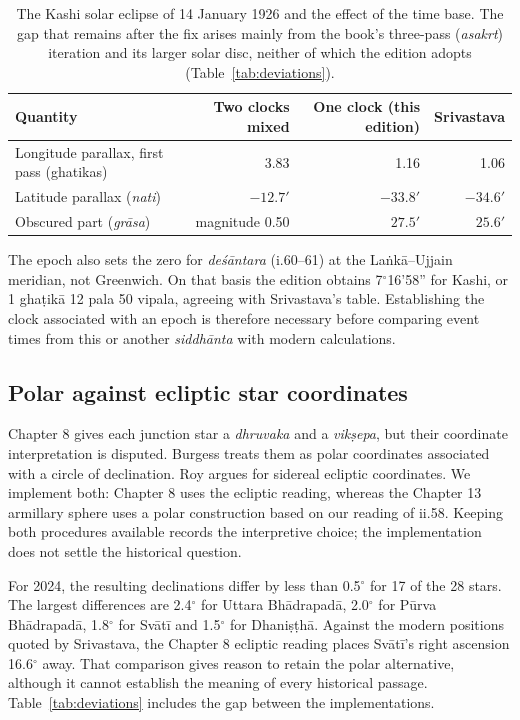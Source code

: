 \documentclass[11pt,a4paper]{article}
\begin{document}
\begin{table}[ht]
\centering
\caption{The Kashi solar eclipse of 14 January 1926 and the effect of the time base. The gap that remains after the fix arises mainly from the book's three-pass (\textit{asakrt}) iteration and its larger solar disc, neither of which the edition adopts (Table~\ref{tab:deviations}).}
\label{tab:kashi}
\small
\begin{tabular}{@{}lrrr@{}}
\toprule
Quantity & Two clocks mixed & One clock (this edition) & Srivastava \\
\midrule
Longitude parallax, first pass (ghatikas) & 3.83 & 1.16 & 1.06 \\
Latitude parallax (\textit{nati}) & $-12.7'$ & $-33.8'$ & $-34.6'$ \\
Obscured part (\textit{gr\=asa}) & magnitude 0.50 & $27.5'$ & $25.6'$ \\
\bottomrule
\end{tabular}
\end{table}

The epoch also sets the zero for \textit{de\'{s}\={a}ntara} (i.60--61) at the La\.{n}k\={a}--Ujjain meridian, not Greenwich. On that basis the edition obtains 7$^\circ$16'58'' for Kashi, or 1 gha\d{t}ik\={a} 12 pala 50 vipala, agreeing with Srivastava's table. Establishing the clock associated with an epoch is therefore necessary before comparing event times from this or another \textit{siddh\={a}nta} with modern calculations.

\subsection{Polar against ecliptic star coordinates}
\label{sec:polar}

Chapter 8 gives each junction star a \textit{dhruvaka} and a \textit{vik\d{s}epa}, but their coordinate interpretation is disputed. Burgess treats them as polar coordinates associated with a circle of declination. Roy \citep{roy2019} argues for sidereal ecliptic coordinates. We implement both: Chapter 8 uses the ecliptic reading, whereas the Chapter 13 armillary sphere uses a polar construction based on our reading of ii.58. Keeping both procedures available records the interpretive choice; the implementation does not settle the historical question.

For 2024, the resulting declinations differ by less than 0.5$^\circ$ for 17 of the 28 stars. The largest differences are 2.4$^\circ$ for Uttara Bh\={a}drapad\={a}, 2.0$^\circ$ for P\={u}rva Bh\={a}drapad\={a}, 1.8$^\circ$ for Sv\={a}t\={i} and 1.5$^\circ$ for Dhani\d{s}\d{t}h\={a}. Against the modern positions quoted by Srivastava, the Chapter 8 ecliptic reading places Sv\={a}t\={i}'s right ascension 16.6$^\circ$ away. That comparison gives reason to retain the polar alternative, although it cannot establish the meaning of every historical passage. Table~\ref{tab:deviations} includes the gap between the implementations.
\end{document}
